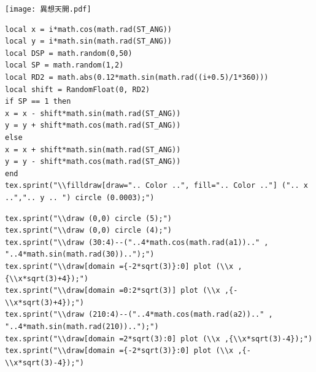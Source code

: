 \newpage
\begin{center}
\begin{figboxs}
\centering
\texttt{[image: 異想天開.pdf]}
\end{figboxs}
\end{center}
\newpage
\newpage
\begin{center}
\begin{figboxs}
\begin{footnotesize}
\begin{verbatim}
local x = i*math.cos(math.rad(ST_ANG))
local y = i*math.sin(math.rad(ST_ANG))
local DSP = math.random(0,50)
local SP = math.random(1,2)
local RD2 = math.abs(0.12*math.sin(math.rad((i+0.5)/1*360)))
local shift = RandomFloat(0, RD2)
if SP == 1 then
x = x - shift*math.sin(math.rad(ST_ANG))
y = y + shift*math.cos(math.rad(ST_ANG))
else
x = x + shift*math.sin(math.rad(ST_ANG))
y = y - shift*math.cos(math.rad(ST_ANG))
end
tex.sprint("\\filldraw[draw=".. Color ..", fill=".. Color .."] (".. x ..",".. y .. ") circle (0.0003);")
\end{verbatim}
\end{footnotesize}
\end{figboxs}
\end{center}
\newpage
\begin{center}
\begin{figboxs}
\begin{footnotesize}
\begin{verbatim}
tex.sprint("\\draw (0,0) circle (5);")
tex.sprint("\\draw (0,0) circle (4);")
tex.sprint("\\draw (30:4)--("..4*math.cos(math.rad(a1)).." , "..4*math.sin(math.rad(30))..");")
tex.sprint("\\draw[domain ={-2*sqrt(3)}:0] plot (\\x ,{\\x*sqrt(3)+4});")
tex.sprint("\\draw[domain =0:2*sqrt(3)] plot (\\x ,{-\\x*sqrt(3)+4});")
tex.sprint("\\draw (210:4)--("..4*math.cos(math.rad(a2)).." , "..4*math.sin(math.rad(210))..");")
tex.sprint("\\draw[domain =2*sqrt(3):0] plot (\\x ,{\\x*sqrt(3)-4});")
tex.sprint("\\draw[domain ={-2*sqrt(3)}:0] plot (\\x ,{-\\x*sqrt(3)-4});")
\end{verbatim}
\end{footnotesize}
\end{figboxs}
\end{center}
